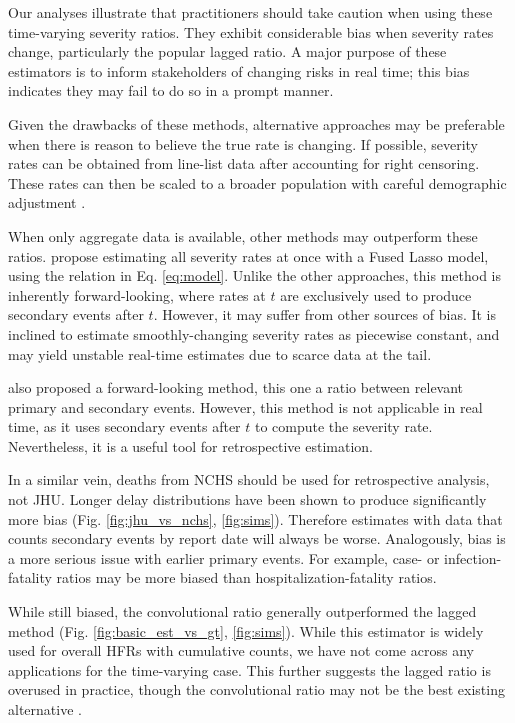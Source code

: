 \documentclass{article}
\begin{document}
Our analyses illustrate that practitioners should take caution when using these time-varying severity ratios. They exhibit considerable bias when severity rates change, particularly the popular lagged ratio. A major purpose of these estimators is to inform stakeholders of changing risks in real time; this bias indicates they may fail to do so in a prompt manner.

Given the drawbacks of these methods, alternative approaches may be preferable when there is reason to believe the true rate is changing. If possible, severity rates can be obtained from line-list data after accounting for right censoring. These rates can then be scaled to a broader population with careful demographic adjustment \cite{verity2020estimates}. 

When only aggregate data is available, other methods may outperform these ratios. \citeauthor{fusedlasso} propose estimating all severity rates at once with a Fused Lasso model, using the relation in Eq. \ref{eq:model}. Unlike the other approaches, this method is inherently forward-looking, where rates at $t$ are exclusively used to produce secondary events after $t$. However, it may suffer from other sources of bias. It is inclined to estimate smoothly-changing severity rates as piecewise constant, and may yield unstable real-time estimates due to scarce data at the tail.

\citeauthor{UKpaper} also proposed a forward-looking method, this one a ratio between relevant primary and secondary events. However, this method is not applicable in real time, as it uses secondary events after $t$ to compute the severity rate. Nevertheless, it is a useful tool for retrospective estimation. 

In a similar vein, deaths from NCHS should be used for retrospective analysis, not JHU. Longer delay distributions have been shown to produce significantly more bias (Fig. \ref{fig:jhu_vs_nchs}, \ref{fig:sims}). Therefore estimates with data that counts secondary events by report date will always be worse. Analogously, bias is a more serious issue with earlier primary events. For example, case- or infection-fatality ratios may be more biased than hospitalization-fatality ratios. 

While still biased, the convolutional ratio generally outperformed the lagged method (Fig. \ref{fig:basic_est_vs_gt}, \ref{fig:sims}). While this estimator is widely used for overall HFRs with cumulative counts, we have not come across any applications for the time-varying case. This further suggests the lagged ratio is overused in practice, though the convolutional ratio may not be the best existing alternative \cite{fusedlasso, UKpaper}.
\end{document}
